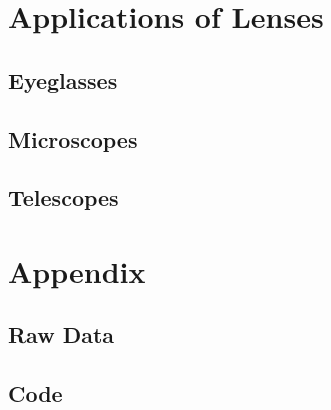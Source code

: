 \documentclass[12pt]{article}
\begin{document}
\section{Applications of Lenses}

\subsection{Eyeglasses}

\subsection{Microscopes}

\subsection{Telescopes}

\newpage



 \label{sec:ref}

\newpage

\section*{Appendix} \label{sec:A}

\listoffigures

\listoftables

\subsection*{Raw Data}



\subsection*{Code}
\end{document}
